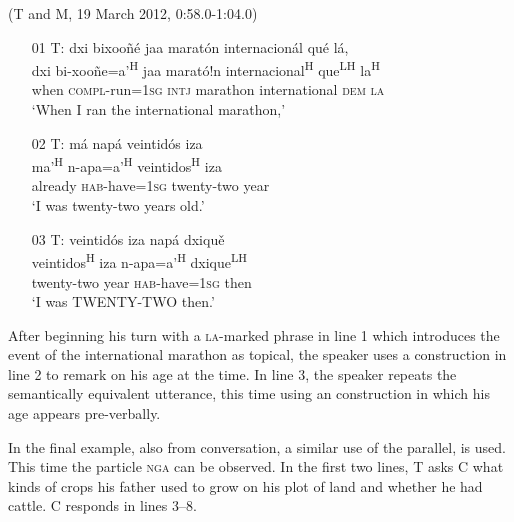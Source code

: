 \ea (T and M, 19 March 2012, 0:58.0-1:04.0)
\begin{itemize}

\item[01 T:] 
\glll dxi bixoo\~{n}\'{e} jaa marat\'{o}n internacion\'{a}l qu\'{e} l\'{a}, \\
dxi bi-xoo\~{n}e=a'\textsuperscript{H} jaa marat\'{o}!n internacional\textsuperscript{H} que\textsuperscript{LH} la\textsuperscript{H} \\
when \textsc{compl}-run=\textsc{1sg} \textsc{intj} marathon international \textsc{dem} \textsc{la} \\
\glt `When I ran the international marathon,'


\item[02 T:] 
\glll m\'{a} nap\'{a} veintid\'{o}s iza \\
 ma'\textsuperscript{H} n-apa=a'\textsuperscript{H} veintidos\textsuperscript{H} iza \\
already \textsc{hab}-have=\textsc{1sg} twenty-two year \\
\glt `I was twenty-two years old.' 


\item[03 T:] 
\glll veintid\'{o}s iza nap\'{a} dxiqu\v{e} \\
veintidos\textsuperscript{H} iza n-apa=a'\textsuperscript{H} dxique\textsuperscript{LH} \\
twenty-two year \textsc{hab}-have=\textsc{1sg} then \\
\glt `I was TWENTY-TWO then.' 


\end{itemize}
\z

After beginning his turn with a \textsc{la}-marked  phrase in line 1 which introduces the event of the international marathon as topical, the speaker uses a  construction in line 2 to remark on his age at the time. In line 3, the speaker repeats the semantically equivalent utterance, this time using an  construction in which his age appears pre-verbally. 


In the final example, also from conversation, a similar use of the parallel,  is used. This time the particle \textsc{nga} can be observed. In the first two lines, T asks C what kinds of crops his father used to grow on his plot of land and whether he had cattle. C responds in lines 3--8.

